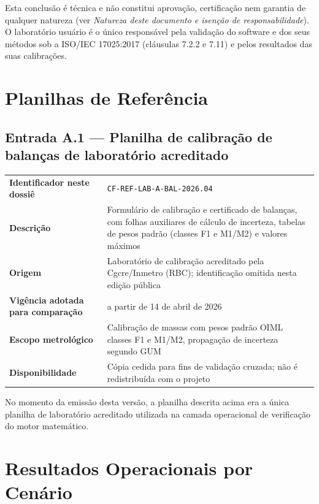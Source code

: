 \documentclass[11pt,a4paper]{article}
\begin{document}
Esta conclusão é técnica e não constitui aprovação, certificação nem garantia de qualquer natureza (ver \emph{Natureza deste documento e isenção de responsabilidade}). O laboratório usuário é o único responsável pela validação do software e dos seus métodos sob a ISO/IEC 17025:2017 (cláusulas 7.2.2 e 7.11) e pelos resultados das suas calibrações.

\appendix

\section{Planilhas de Referência}
\label{app:planilhas}

\subsection{Entrada A.1 --- Planilha de calibração de balanças de laboratório acreditado}

\begin{tabularx}{\textwidth}{l X}
  \toprule
  \textbf{Identificador neste dossiê} & \texttt{CF-REF-LAB-A-BAL-2026.04} \\
  \textbf{Descrição} & Formulário de calibração e certificado de balanças, com folhas auxiliares de cálculo de incerteza, tabelas de pesos padrão (classes F1 e M1/M2) e valores máximos \\
  \textbf{Origem} & Laboratório de calibração acreditado pela Cgcre/Inmetro (RBC); identificação omitida nesta edição pública \\
  \textbf{Vigência adotada para comparação} & a partir de 14 de abril de 2026 \\
  \textbf{Escopo metrológico} & Calibração de massas com pesos padrão OIML classes F1 e M1/M2, propagação de incerteza segundo GUM \\
  \textbf{Disponibilidade} & Cópia cedida para fins de validação cruzada; não é redistribuída com o projeto \\
  \bottomrule
\end{tabularx}

\vspace{0.3cm}
No momento da emissão desta versão, a planilha descrita acima era a única planilha de laboratório acreditado utilizada na camada operacional de verificação do motor matemático.

\section{Resultados Operacionais por Cenário}
\label{app:planilhas-resultados}
\end{document}
